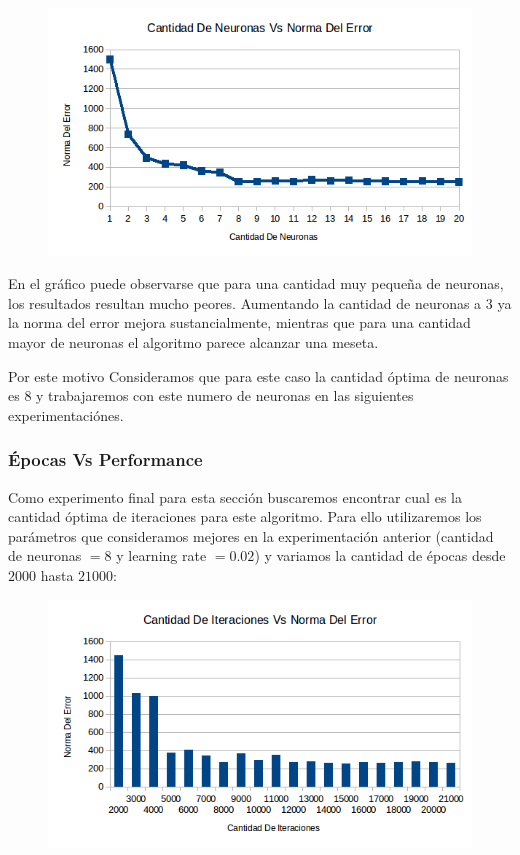 \begin{figure}[h!]
  \centering
    \includegraphics[scale=0.4]{ej2/test_neuronas.png}
\end{figure}

En el gráfico puede observarse que para una cantidad muy pequeña de neuronas, los resultados resultan mucho peores. Aumentando la cantidad de neuronas a $3$ ya la norma del error mejora sustancialmente, mientras que para una cantidad mayor de neuronas el algoritmo parece alcanzar una meseta.

Por este motivo Consideramos que para este caso la cantidad óptima de neuronas es $8$ y trabajaremos con este numero de neuronas en las siguientes experimentaciónes.


\subsubsection{Épocas Vs Performance}

Como experimento final para esta sección buscaremos encontrar cual es la cantidad óptima de iteraciones para este algoritmo. Para ello utilizaremos los parámetros que consideramos mejores en la experimentación anterior (cantidad de neuronas $= 8$ y learning rate $= 0.02$) y variamos la cantidad de épocas desde $2000$ hasta $21000$:

\begin{figure}[h!]
  \centering
    \includegraphics[scale=0.4]{ej2/test_iteraciones.png}
\end{figure}

